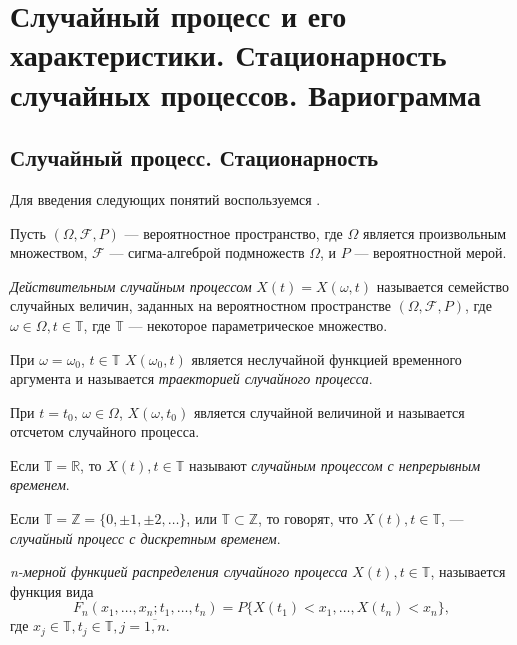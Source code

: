 \newpage
\chapter{Случайный процесс и его характеристики. Стационарность случайных процессов. Вариограмма}
\label{c:definitions}

\section{Случайный процесс. Стационарность}

Для введения следующих понятий воспользуемся \cite{brillinjer-ts, trush-ts}.

Пусть $ (\Omega, \mathcal{F}, P) $ --- вероятностное пространство, где $\Omega$ является произвольным множеством, $\mathcal{F}$ --- сигма-алгеброй подмножеств $\Omega$, и $P$ --- вероятностной мерой.

\begin{Definition}
\label{def:stochastic-process}
	\textit{Действительным случайным процессом} $ X(t) = X(\omega, t) $ называется семейство случайных величин, заданных на вероятностном пространстве $ (\Omega, \mathcal{F}, P) $, где $ \omega \in \Omega, t \in \mathbb{T}$, где $ \mathbb{T} $ --- некоторое параметрическое множество.

	При $ \omega = \omega_{0} $, $ t \in \mathbb{T} $ $ X(\omega_{0}, t) $ является неслучайной функцией временного аргумента и называется \textit{траекторией случайного процесса}.

	При $ t = t_{0} $, $ \omega \in \Omega $, $ X(\omega, t_{0}) $ является случайной величиной и называется отсчетом случайного процесса.
\end{Definition}

\begin{Definition}
    Если $ \mathbb{T} = \mathbb{R} $, то $ X(t), t \in \mathbb{T} $ называют \textit{случайным процессом с непрерывным временем}.
\end{Definition}

\begin{Definition}
	Если $ \mathbb{T} = \mathbb{Z} = \{ 0, \pm 1, \pm 2, \dots \} $, или $ \mathbb{T} \subset \mathbb{Z} $, то говорят, что $ X(t), t \in \mathbb{T} $, --- \textit{случайный процесс с дискретным временем}.
\end{Definition}

\begin{Definition}
\label{def:distr_func}
	\textit{n-мерной функцией распределения случайного процесса} $ X(t), t \in \mathbb{T} $, называется функция вида
	\begin{equation*}
		F_n(x_1, \dots, x_n; t_1, \dots, t_n) = P \{ X(t_1) < x_1, \dots, X(t_n) < x_n \},
	\end{equation*}
	где $ x_j \in \mathbb{T}, t_j \in \mathbb{T}, j = \overline{1,n} $.
\end{Definition}

